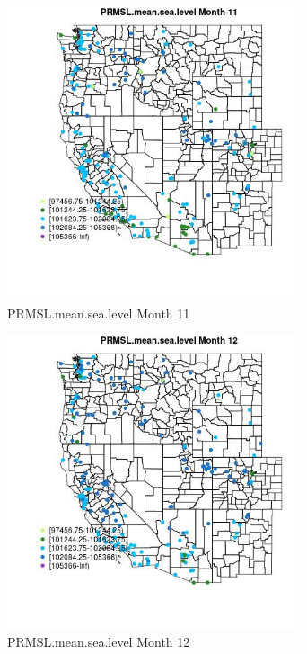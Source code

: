 \begin{figure} 
\centering  
\includegraphics[width=0.77\textwidth]{Code_Outputs/Report_ML_input_PM25_Step4_part_e_de_duplicated_aveswNAs_MapObsMo11PRMSLmeansealevel.jpg} 
\caption{\label{fig:Report_ML_input_PM25_Step4_part_e_de_duplicated_aveswNAsMapObsMo11PRMSLmeansealevel}PRMSL.mean.sea.level Month 11} 
\end{figure} 
 

\begin{figure} 
\centering  
\includegraphics[width=0.77\textwidth]{Code_Outputs/Report_ML_input_PM25_Step4_part_e_de_duplicated_aveswNAs_MapObsMo12PRMSLmeansealevel.jpg} 
\caption{\label{fig:Report_ML_input_PM25_Step4_part_e_de_duplicated_aveswNAsMapObsMo12PRMSLmeansealevel}PRMSL.mean.sea.level Month 12} 
\end{figure} 
 

